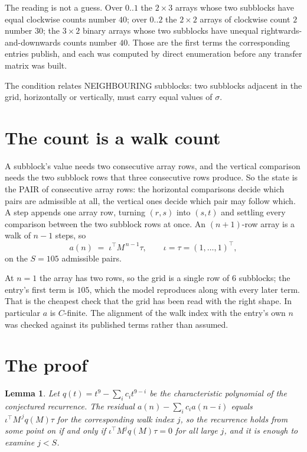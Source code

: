 \documentclass[11pt,a4paper]{article}
\theoremstyle{plain}
\newtheorem{lemma}[theorem]{Lemma}
\theoremstyle{definition}
\begin{document}
The reading is not a guess. Over $0..1$ the $2\times3$ arrays whose two subblocks have equal
clockwise counts number $40$; over $0..2$ the $2\times2$ arrays of clockwise count $2$ number
$30$; the $3\times2$ binary arrays whose two subblocks have unequal rightwards-and-downwards
counts number $40$. Those are the first terms the corresponding entries publish, and each was
computed by direct enumeration before any transfer matrix was built.

The condition relates NEIGHBOURING subblocks: two subblocks adjacent in the grid, horizontally
or vertically, must carry equal values of $\sigma$.

\section{The count is a walk count}

A subblock's value needs two consecutive array rows, and the vertical
comparison needs the two subblock rows that three consecutive rows produce. So the state is the
PAIR of consecutive array rows: the horizontal comparisons decide which pairs are admissible at
all, the vertical ones decide which pair may follow which. A step appends one array row,
turning $(r,s)$ into $(s,t)$ and settling every comparison between the two subblock rows at
once. An $(n+1)$-row array is a walk of $n-1$ steps, so
\[
a(n)\;=\;\iota^{\!\top}M^{\,n-1}\tau,\qquad\iota=\tau=(1,\dots,1)^{\!\top},
\]
on the $S=105$ admissible pairs.

At $n=1$ the array has two rows, so the grid is a single row of $6$
subblocks; the entry's first term is $105$, which the model
reproduces along with every later term. That is the cheapest check that the grid has been read
with the right shape.
In particular $a$ is $C$-finite. The alignment of the walk index with the entry's own $n$ was
checked against its published terms rather than assumed.

\section{The proof}

\begin{lemma}\label{lem:crit}
Let $q(t)=t^{9}-\sum_i c_it^{9-i}$ be the characteristic polynomial of the
conjectured recurrence. The residual $a(n)-\sum_ic_ia(n-i)$ equals
$\iota^{\!\top}M^{\,j}q(M)\tau$ for the corresponding walk index $j$, so the recurrence
holds from some point on if and only if $\iota^{\!\top}M^{j}q(M)\tau=0$ for all large $j$,
and it is enough to examine $j<S$.
\end{lemma}
\end{document}
